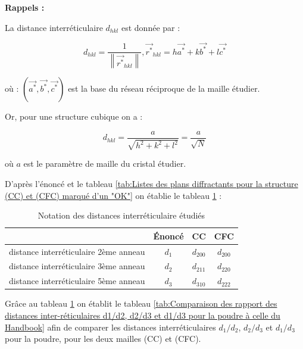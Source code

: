 \textbf{Rappels :}


\vspace{0.2cm}
La distance interréticulaire $d_{hkl}$ est donnée par :

\begin{equation}
	d_{hkl} = \frac{1}{\left\| \vec{r^*}_{hkl}  \right\|} , \vec{r^*}_{hkl} = h\vec{a^*} + k\vec{b^*} + l\vec{c^*}
\end{equation}

où : $(\vec{a^*},\vec{b^*},\vec{c^*})$ est la base du réseau réciproque de la maille étudier.

Or, pour une structure cubique on a : 

\begin{equation}\label{eq: d_hkl CFC}
	d_{hkl} = \frac{a}{\sqrt{h^2+ k^2 +l^2 }} = \frac{a}{\sqrt{N}}
\end{equation} 

où $a$ est le paramètre de maille du cristal étudier.

D'après l'énoncé et le tableau \ref{tab:Listes des plans diffractants pour la structure (CC) et (CFC) marqué d’un "OK"} on établie le tableau \ref{tab:Notation des distances interéticulaire étudié} : 

\begin{table}[h!]
	\centering
	\begin{tabular}{c|c|c|c|}
		\cline{2-4}
		& Énoncé & CC & CFC \\ \hline
		\multicolumn{1}{|l|}{distance interréticulaire 2ème anneau} & $d_1$     &  $d_{200}$  & $d_{200}$   \\ \hline
		\multicolumn{1}{|l|}{distance interréticulaire 3ème anneau} & $d_2$     &  $d_{211}$   &  $d_{220}$    \\ \hline
		\multicolumn{1}{|l|}{distance interréticulaire 5ème anneau} & $d_3$     &  $d_{310}$  &   $d_{222}$  \\ \hline
	\end{tabular}
	\caption{\centering Notation des distances interréticulaire étudiés}
	\label{tab:Notation des distances interéticulaire étudié}
\end{table}






\newpage

Grâce au tableau \ref{tab:Notation des distances interéticulaire étudié} on établit le tableau  \ref{tab:Comparaison des rapport des distances inter-réticulaires d1/d2, d2/d3 et d1/d3 pour la poudre à celle du Handbook} afin de comparer les distances interréticulaires
	$d_1/d_2$, $d_2/d_3$ et $d_1/d_3$ pour la poudre, pour les deux mailles (CC) et (CFC).


